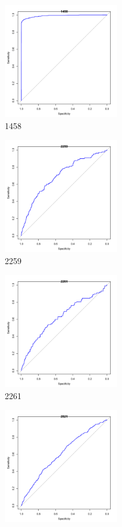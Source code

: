 \begin{figure}[htbp]

\begin{subfigure}{0.5\textwidth}
\includegraphics[width=0.9\linewidth, height=5cm]{1458.pdf}
\caption{1458}
\label{fig:sub1}
\end{subfigure}
\begin{subfigure}{0.5\textwidth}
\includegraphics[width=0.9\linewidth, height=5cm]{2259.pdf}
\caption{2259}
\label{fig:2259}
\end{subfigure}
\begin{subfigure}{0.5\textwidth}
\includegraphics[width=0.9\linewidth, height=5cm]{2261.pdf}
\caption{2261}
\label{fig:2261}
\end{subfigure}
\begin{subfigure}{0.5\textwidth}
\includegraphics[width=0.9\linewidth, height=5cm]{2821.pdf}

\end{subfigure}
\end{figure}
